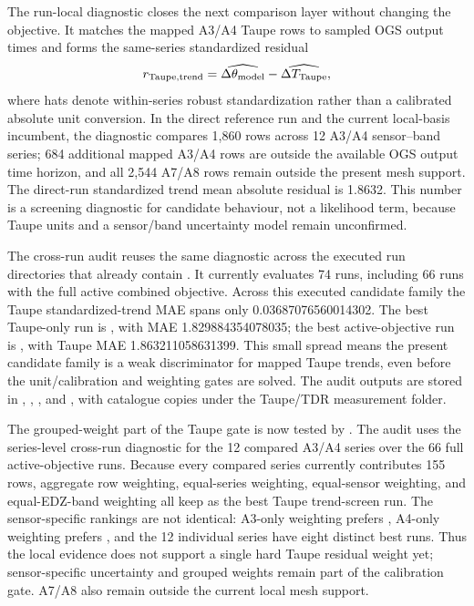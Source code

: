 The run-local diagnostic  closes the
next comparison layer without changing the objective.  It matches the mapped A3/A4
Taupe rows to sampled OGS output times and forms the same-series standardized
residual
\[
  r_{\rm Taupe,trend} =
  \widehat{\Delta\theta_{\rm model}} -
  \widehat{\Delta T_{\rm Taupe}},
\]
where hats denote within-series robust standardization rather than a calibrated
absolute unit conversion.  In the direct reference run and the current local-basis
incumbent, the diagnostic compares 1,860 rows across 12 A3/A4 sensor--band series;
684 additional mapped A3/A4 rows are outside the available OGS output time horizon,
and all 2,544 A7/A8 rows remain outside the present mesh support.  The direct-run
standardized trend mean absolute residual is 1.8632.  This number is a screening
diagnostic for candidate behaviour, not a likelihood term, because Taupe units and a
sensor/band uncertainty model remain unconfirmed.

The cross-run audit  reuses the
same diagnostic across the executed run directories that already contain
.  It currently evaluates 74 runs, including 66 runs with
the full active combined objective.  Across this executed candidate family the Taupe
standardized-trend MAE spans only 0.03687076560014302.  The best Taupe-only run is
, with MAE 1.829884354078035; the best
active-objective run is ,
with Taupe MAE 1.863211058631399.  This small spread means the present candidate
family is a weak discriminator for mapped Taupe trends, even before the
unit/calibration and weighting gates are solved.  The audit outputs are stored in
,
,
, and
, with catalogue copies under the Taupe/TDR
measurement folder.

The grouped-weight part of the Taupe gate is now tested by
.  The audit uses the
series-level cross-run diagnostic for the 12 compared A3/A4 series over the 66 full
active-objective runs.  Because every compared series currently contributes 155 rows,
aggregate row weighting, equal-series weighting, equal-sensor weighting, and
equal-EDZ-band weighting all keep
 as the best Taupe trend-screen run.  The
sensor-specific rankings are not identical: A3-only weighting prefers
, A4-only weighting prefers
, and the 12 individual
series have eight distinct best runs.  Thus the local evidence does not support a
single hard Taupe residual weight yet; sensor-specific uncertainty and grouped
weights remain part of the calibration gate.  A7/A8 also remain outside the current
local mesh support.

